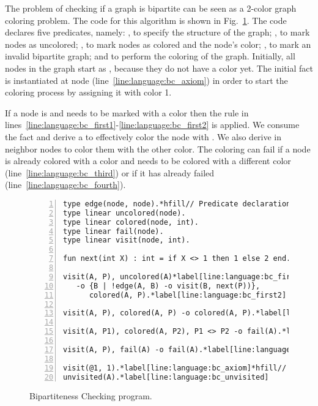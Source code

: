 The problem of checking if a graph is bipartite can be seen as a 2-color graph
coloring problem. The code for this algorithm is shown in
Fig.~\ref{language:code:bichecking}. The code declares five predicates, namely:
, to specify the structure of the graph; , to mark
nodes as uncolored; , to mark nodes as colored and the node's
color; , to mark an invalid bipartite graph; and  to
perform the coloring of the graph.  Initially, all nodes in the graph start as
, because they do not have a color yet. The initial fact
 is instantiated at node 
(line~\ref{line:language:bc_axiom}) in order to start the coloring process by
assigning it with color 1.

If a node is  and needs to be marked with a color  then
the rule in lines~\ref{line:language:bc_first1}-\ref{line:language:bc_first2} is
applied. We consume the  fact and derive a 
to effectively color the node with . We also derive  in neighbor nodes to color them with the other color.  The coloring
can fail if a node is already colored with a color  and needs to be
colored with a different color (line~\ref{line:language:bc_third}) or if it has
already failed (line~\ref{line:language:bc_fourth}).

\begin{figure}[h!]
\begin{Verbatim}[numbers=left,fontsize=\codesize,commandchars=\*\[\]]
type edge(node, node).*hfill// Predicate declaration
type linear uncolored(node).
type linear colored(node, int).
type linear fail(node).
type linear visit(node, int).

fun next(int X) : int = if X <> 1 then 1 else 2 end.*hfill// Function declaration

visit(A, P), uncolored(A)*label[line:language:bc_first1]*hfill// Rule 1: coloring a node
   -o {B | !edge(A, B) -o visit(B, next(P))},
      colored(A, P).*label[line:language:bc_first2]

visit(A, P), colored(A, P) -o colored(A, P).*label[line:language:bc_second]*hfill// Rule 2: node is already colored

visit(A, P1), colored(A, P2), P1 <> P2 -o fail(A).*label[line:language:bc_third]*hfill// Rule 3: graph is not bipartite

visit(A, P), fail(A) -o fail(A).*label[line:language:bc_fourth]*hfill// Rule 4: graph is still not bipartite

visit(@1, 1).*label[line:language:bc_axiom]*hfill// Initial facts
unvisited(A).*label[line:language:bc_unvisited]
\end{Verbatim}
  \caption{Bipartiteness Checking program.}
  \label{language:code:bichecking}
\end{figure}

